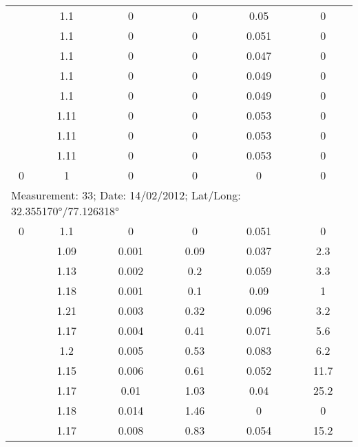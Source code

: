 \begin{longtable}{cccccc}
		& 1.1   & 0     & 0     & 0.05  & 0 \\
		
		& 1.1   & 0     & 0     & 0.051 & 0 \\
		
		& 1.1   & 0     & 0     & 0.047 & 0 \\
		
		& 1.1   & 0     & 0     & 0.049 & 0 \\
		
		& 1.1   & 0     & 0     & 0.049 & 0 \\
		
		& 1.11  & 0     & 0     & 0.053 & 0 \\
		
		& 1.11  & 0     & 0     & 0.053 & 0 \\
		
		& 1.11  & 0     & 0     & 0.053 & 0 \\
		
		0     & 1     & 0     & 0     & 0     & 0 \\
		\midrule
		\multicolumn{6}{l}{Measurement: 33; Date: 14/02/2012;
			Lat/Long: 32.355170°/77.126318°} \\		
		\midrule
		0     & 1.1   & 0     & 0     & 0.051 & 0 \\
		
		& 1.09  & 0.001 & 0.09  & 0.037 & 2.3 \\
		
		& 1.13  & 0.002 & 0.2   & 0.059 & 3.3 \\
		
		& 1.18  & 0.001 & 0.1   & 0.09  & 1 \\
		
		& 1.21  & 0.003 & 0.32  & 0.096 & 3.2 \\
		
		& 1.17  & 0.004 & 0.41  & 0.071 & 5.6 \\
		
		& 1.2   & 0.005 & 0.53  & 0.083 & 6.2 \\
		
		& 1.15  & 0.006 & 0.61  & 0.052 & 11.7 \\
		
		& 1.17  & 0.01  & 1.03  & 0.04  & 25.2 \\
		
		& 1.18  & 0.014 & 1.46  & 0     & 0 \\
		
		& 1.17  & 0.008 & 0.83  & 0.054 & 15.2 \\
		

\end{longtable}
